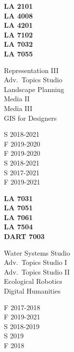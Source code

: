 \documentclass[10pt]{developercv} %
\begin{document}
\begin{minipage}[t]{0.1\textwidth} 
\textbf{LA 2101}\\
\textbf{LA 4008}\\
\textbf{LA 4201}\\
\textbf{LA 7102}\\
\textbf{LA 7032}\\
\textbf{LA 7055}\\
\end{minipage}
\begin{minipage}[t]{0.2\textwidth} 
Representation III\\
Adv.~Topics Studio\\
Landscape Planning \\
Media II \\
Media III\\
GIS for Designers\\
\end{minipage}
\begin{minipage}[t]{0.2\textwidth} 
S 2018-2021\\
F 2019-2020\\
F 2019-2020\\
S 2018-2021\\
S 2017-2021\\
F 2019-2021\\
\end{minipage}
\begin{minipage}[t]{0.15\textwidth} 
\textbf{LA 7031}\\
\textbf{LA 7051}\\
\textbf{LA 7061}\\
\textbf{LA 7504}\\
\textbf{DART 7003}\\
\end{minipage}
\begin{minipage}[t]{0.2\textwidth} 
Water Systems Studio\\
Adv.~Topics Studio I\\
Adv.~Topics Studio II\\
Ecological Robotics\\
Digital Humanities\\
\end{minipage}
\begin{minipage}[t]{0.15\textwidth} 
F 2017-2018\\
F 2019-2021\\
S 2018-2019\\
S 2019\\
F 2018\\
\end{minipage}



\end{document}
